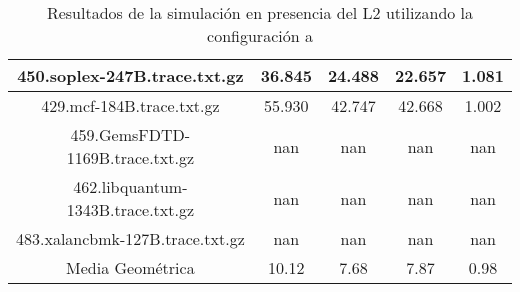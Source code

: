 \begin{table}[H]
\begin{tabular}{|c|c|c|c|c|}
450.soplex-247B.trace.txt.gz & 36.845 & 24.488 &  22.657 & 1.081\\\hline
429.mcf-184B.trace.txt.gz & 55.930 & 42.747 &  42.668 & 1.002\\\hline
459.GemsFDTD-1169B.trace.txt.gz & nan & nan &  nan & nan\\\hline
462.libquantum-1343B.trace.txt.gz & nan & nan &  nan & nan\\\hline
483.xalancbmk-127B.trace.txt.gz & nan & nan &  nan & nan\\\hline
Media Geométrica & 10.12 & 7.68& 7.87 & 0.98\\\hline
\end{tabular}
\caption{Resultados de la simulación en presencia del L2 utilizando la configuración a}
\label{tab:amatL3a}
\end{table}